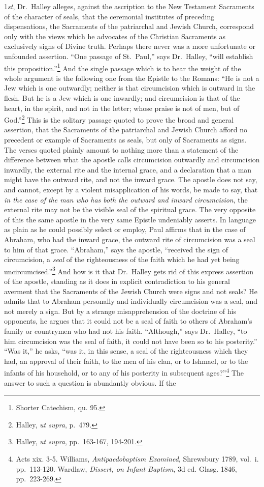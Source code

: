\documentclass[]{book}
\begin{document}
1\emph{st}, Dr.~Halley alleges, against the ascription to the New Testament Sacraments of the character of seals, that the ceremonial institutes of preceding dispensations, the Sacraments of the patriarchal and Jewish Church, correspond only with the views which he advocates of the Christian Sacraments as exclusively signs of Divine truth. Perhaps there never was a more unfortunate or unfounded assertion. ``One passage of St.~Paul,'' says Dr.~Halley, ``will establish this proposition.''\footnote{Shorter Catechism, qu. 95.} And the single passage which is to bear the weight of the whole argument is the following one from the Epistle to the Romans: ``He is not a Jew which is one outwardly; neither is that circumcision which is outward in the flesh. But he is a Jew which is one inwardly; and circumcision is that of the heart, in the spirit, and not in the letter; whose praise is not of men, but of God.''\footnote{Halley, \emph{ut supra}, p.~479.} This is the solitary passage quoted to prove the broad and general assertion, that the Sacraments of the patriarchal and Jewish Church afford no precedent or example of Sacraments as seals, but only of Sacraments as signs. The verses quoted plainly amount to nothing more than a statement of the difference between what the apostle calls circumcision outwardly and circumcision inwardly, the external rite and the internal grace, and a declaration that a man might have the outward rite, and not the inward grace. The apostle does not say, and cannot, except by a violent misapplication of his words, be made to say, that \emph{in the case of the man who has both the outward and inward circumcision}, the external rite may not be the visible seal of the spiritual grace. The very opposite of this the same apostle in the very same Epistle undeniably asserts. In language as plain as he could possibly select or employ, Paul affirms that in the case of Abraham, who had the inward grace, the outward rite of circumcision was a seal to him of that grace. ``Abraham,'' says the apostle, ``received the sign of circumcision, a \emph{seal} of the righteousness of the faith which he had yet being uncircumcised.''\footnote{Halley, \emph{ut supra}, pp.~163-167, 194-201.} And how is it that Dr.~Halley gets rid of this express assertion of the apostle, standing as it does in explicit contradiction to his general averment that the Sacraments of the Jewish Church were signs and not seals? He admits that to Abraham personally and individually circumcision was a seal, and not merely a sign. But by a strange misapprehension of the doctrine of his opponents, he argues that it could not be a seal of faith to others of Abraham's family or countrymen who had not his faith. ``Although,'' says Dr.~Halley, ``to him circumcision was the seal of faith, it could not have been so to his posterity.'' ``Was it,'' he asks, ``was it, in this sense, a seal of the righteousness which they had, an approval of their faith, to the men of his clan, or to Ishmael, or to the infants of his household, or to any of his posterity in subsequent ages?''\footnote{Acts xix. 3-5. Williams, \emph{Antipaedobaptism Examined}, Shrewsbury 1789, vol.~i. pp.~113-120. Wardlaw, \emph{Dissert, on Infant Baptism}, 3d ed. Glasg. 1846, pp.~223-269.} The answer to such a question is abundantly obvious. If the 
\end{document}
